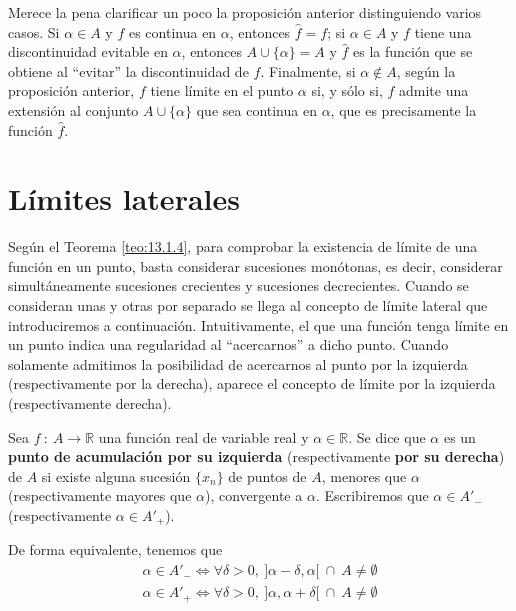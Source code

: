 Merece la pena clarificar un poco la proposición anterior distinguiendo varios casos. Si $\alpha \in A$ y $f$ es continua en $\alpha$, entonces $\hat{f} = f$; si $\alpha \in A$ y $f$ tiene una discontinuidad evitable en $\alpha$, entonces $A \cup \{\alpha\} = A$ y $\hat{f}$ es la función que se obtiene al ``evitar'' la discontinuidad de $f$. Finalmente, si $\alpha \notin A$, según la proposición anterior, $f$ tiene límite en el punto $\alpha$ si, y sólo si, $f$ admite una extensión al conjunto $A \cup \{\alpha\}$ que sea continua en $\alpha$, que es precisamente la función $\hat{f}$.



\section{Límites laterales}
Según el Teorema \ref{teo:13.1.4}, para comprobar la existencia de límite de una función en un punto, basta considerar sucesiones monótonas, es decir, considerar simultáneamente sucesiones crecientes y sucesiones decrecientes. Cuando se consideran unas y otras por separado se llega al concepto de límite lateral que introduciremos a continuación. Intuitivamente, el que una función tenga límite en un punto indica una regularidad al ``acercarnos'' a dicho punto. Cuando solamente admitimos la posibilidad de acercarnos al punto por la izquierda (respectivamente por la derecha), aparece el concepto de límite por la izquierda (respectivamente derecha).
\begin{definicion}
    Sea $f ~:~ A \longrightarrow \mathbb{R}$ una función real de variable real y $\alpha \in \mathbb{R}$.
    Se dice que $\alpha$ es un \textbf{punto de acumulación por su izquierda} (respectivamente \textbf{por su derecha}) de $A$ si existe alguna sucesión $\{x_n\}$ de puntos de $A$, menores que $\alpha$ (respectivamente mayores que $\alpha$), convergente a $\alpha$. Escribiremos que $\alpha \in A'_{-}$ (respectivamente $\alpha \in A'_{+}$).
    
    De forma equivalente, tenemos que
    \begin{gather*}
        \alpha \in A'_{-} \Longleftrightarrow \forall \delta > 0, ~ ]\alpha-\delta,\alpha[ ~ \cap ~ A \neq \emptyset \\
        \alpha \in A'_{+} \Longleftrightarrow \forall \delta > 0, ~ ]\alpha,\alpha+\delta[ ~ \cap ~ A \neq \emptyset
    \end{gather*}
\end{definicion}

